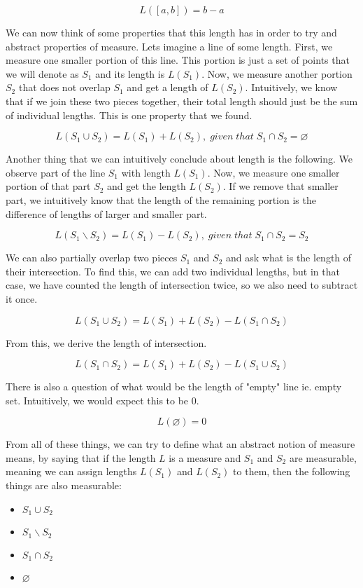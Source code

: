 \documentclass{article}
\begin{document}
\[ L([a, b]) = b - a \]

We can now think of some properties that this length has in order to try and abstract properties of measure. Lets imagine a line of some length. First, we measure one smaller portion of this line. This portion is just a set of points that we will denote as $S_1$ and its length is $L(S_1)$. Now, we measure another portion $S_2$ that does not overlap $S_1$ and get a length of $L(S_2)$. Intuitively, we know that if we join these two pieces together, their total length should just be the sum of individual lengths. This is one property that we found.

\[ L(S_1 \cup S_2) = L(S_1) + L(S_2),\;given\;that\; S_1 \cap S_2 = \varnothing \]

Another thing that we can intuitively conclude about length is the following. We observe part of the line $S_1$ with length $L(S_1)$. Now, we measure one smaller portion of that part $S_2$ and get the length $L(S_2)$. If we remove that smaller part, we intuitively know that the length of the remaining portion is the difference of lengths of larger and smaller part.

\[ L(S_1 \backslash S_2) = L(S_1) - L(S_2),\;given\;that\; S_1 \cap S_2 = S_2 \]

We can also partially overlap two pieces $S_1$ and $S_2$ and ask what is the length of their intersection. To find this, we can add two individual lengths, but in that case, we have counted the length of intersection twice, so we also need to subtract it once.

\[ L(S_1 \cup S_2) = L(S_1) + L(S_2) - L(S_1 \cap S_2) \]

From this, we derive the length of intersection.

\[ L(S_1 \cap S_2) = L(S_1) + L(S_2) - L(S_1 \cup S_2) \]

There is also a question of what would be the length of "empty" line ie. empty set. Intuitively, we would expect this to be 0.

\[ L(\varnothing) = 0 \]

From all of these things, we can try to define what an abstract notion of measure means, by saying that if the length $L$ is a measure and $S_1$ and $S_2$ are measurable, meaning we can assign lengths $L(S_1)$ and $L(S_2)$ to them, then the following things are also measurable:

\begin{itemize}
    \item $S_1 \cup S_2$
    \item $S_1 \backslash S_2$
    \item $S_1 \cap S_2$
    \item $\varnothing$
\end{itemize}
\end{document}
